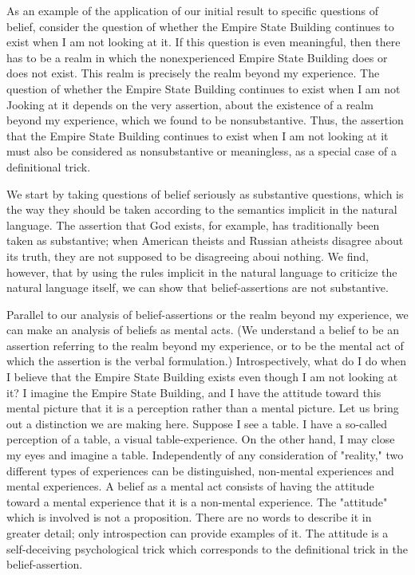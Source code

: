 As an example of the application of our initial result to specific 
questions of belief, consider the question of whether the Empire State 
Building continues to exist when I am not looking at it. If this question is 
even meaningful, then there has to be a realm in which the nonexperienced 
Empire State Building does or does not exist. This realm is precisely the 
realm beyond my experience. The question of whether the Empire State 
Building continues to exist when I am not Jooking at it depends on the very 
assertion, about the existence of a realm beyond my experience, which we 
found to be nonsubstantive. Thus, the assertion that the Empire State 
Building continues to exist when I am not looking at it must also be 
considered as nonsubstantive or meaningless, as a special case of a 
definitional trick. 

We start by taking questions of belief seriously as substantive questions, 
which is the way they should be taken according to the semantics implicit in 
the natural language. The assertion that God exists, for example, has 
traditionally been taken as substantive; when American theists and Russian 
atheists disagree about its truth, they are not supposed to be disagreeing 
aboui nothing. We find, however, that by using the rules implicit in the 
natural language to criticize the natural language itself, we can show that 
belief-assertions are not substantive. 

Parallel to our analysis of belief-assertions or the realm beyond my 
experience, we can make an analysis of beliefs as mental acts. (We 
understand a belief to be an assertion referring to the realm beyond my 
experience, or to be the mental act of which the assertion is the verbal 
formulation.) Introspectively, what do I do when I believe that the Empire 
State Building exists even though I am not looking at it? I imagine the 
Empire State Building, and I have the attitude toward this mental picture 
that it is a perception rather than a mental picture. Let us bring out a 
distinction we are making here. Suppose I see a table. I have a so-called 
perception of a table, a visual table-experience. On the other hand, I may 
close my eyes and imagine a table. Independently of any consideration of 
"reality," two different types of experiences can be distinguished, 
non-mental experiences and mental experiences. A belief as a mental act 
consists of having the attitude toward a mental experience that it is a 
non-mental experience. The "attitude" which is involved is not a 
proposition. There are no words to describe it in greater detail; only 
introspection can provide examples of it. The attitude is a self-deceiving 
psychological trick which corresponds to the definitional trick in the 
belief-assertion. 

